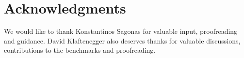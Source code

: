 \documentclass[aps,pre,preprint,nofootinbib]{revtex4}
\begin{document}
\section{Acknowledgments}
 We would like to thank Konstantinos Sagonas for valuable input, proofreading and guidance. 
 David Klaftenegger also deserves thanks for valuable discussions, contributions to the benchmarks and proofreading.




\end{document}
